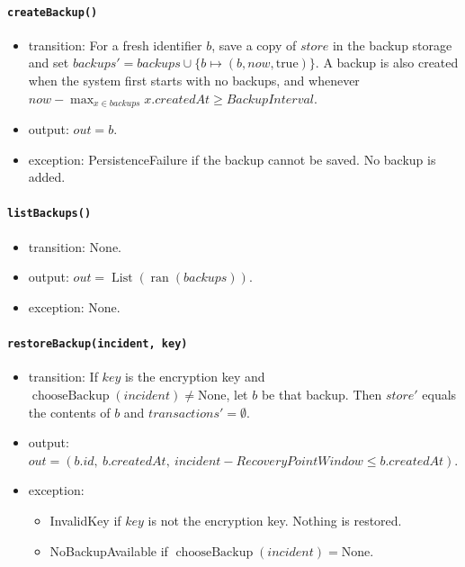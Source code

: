 \documentclass[12pt, titlepage]{article}
\begin{document}
\paragraph{\texttt{createBackup()}}
\begin{itemize}
    \item transition: For a fresh identifier $b$, save a copy of $\mathit{store}$ in the backup storage and set $\mathit{backups}'=\mathit{backups}\cup\{b\mapsto(b,\mathit{now},\text{true})\}$.
    A backup is also created when the system first starts with no backups, and whenever $\mathit{now}-\max_{x\in\mathit{backups}}x.createdAt\ge\mathit{BackupInterval}$.
    \item output: $out=b$.
    \item exception: PersistenceFailure if the backup cannot be saved. No backup is added.
\end{itemize}

\paragraph{\texttt{listBackups()}}
\begin{itemize}
    \item transition: None.
    \item output: $out=\operatorname{List}(\operatorname{ran}(\mathit{backups}))$.
    \item exception: None.
\end{itemize}

\paragraph{\texttt{restoreBackup(incident, key)}}
\begin{itemize}
    \item transition: If $key$ is the encryption key and $\operatorname{chooseBackup}(incident)\ne\text{None}$,
    let $b$ be that backup. Then $\mathit{store}'$ equals the contents of $b$ and $\mathit{transactions}'=\emptyset$.
    \item output: $out=(b.id,\ b.createdAt,\ \mathit{incident}-\mathit{RecoveryPointWindow}\le b.createdAt)$.
    \item exception:
    \begin{itemize}
        \item InvalidKey if $key$ is not the encryption key. Nothing is restored.
        \item NoBackupAvailable if $\operatorname{chooseBackup}(incident)=\text{None}$.
    \end{itemize}
\end{itemize}
\end{document}
